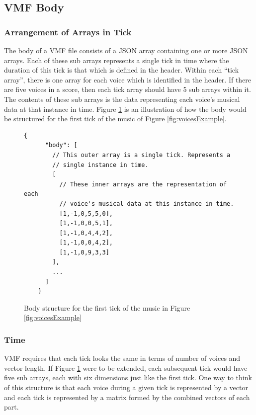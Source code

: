 \subsection{VMF Body}

\subsubsection{Arrangement of Arrays in Tick}

The body of a VMF file consists of a JSON array containing one or more JSON arrays. Each of these sub arrays represents a single tick in time where the duration of this tick is that which is defined in the header. Within each ``tick array'', there is one array for each voice which is identified in the header. If there are five voices in a score, then each tick array should have 5 sub arrays within it. The contents of these sub arrays is the data representing each voice's musical data at that instance in time. Figure \ref{fig:fiveVoiceTick} is an illustration of how the body would be structured for the first tick of the music of Figure \ref{fig:voicesExample}.

\begin{figure}
  \begin{center}
    \begin{Verbatim}[fontfamily=courier, xleftmargin=\parindent]
    {
      "body": [
        // This outer array is a single tick. Represents a
        // single instance in time.
        [
          // These inner arrays are the representation of each
          // voice's musical data at this instance in time.
          [1,-1,0,5,5,0],
          [1,-1,0,0,5,1],
          [1,-1,0,4,4,2],
          [1,-1,0,0,4,2],
          [1,-1,0,9,3,3]
        ],
        ...
      ]
    }
    \end{Verbatim}
    \caption{Body structure for the first tick of the music in Figure \ref{fig:voicesExample}}
    \label{fig:fiveVoiceTick}
  \end{center}
\end{figure}

\subsubsection{Time}

VMF requires that each tick looks the same in terms of number of voices and vector length. If Figure \ref{fig:fiveVoiceTick} were to be extended, each subsequent tick would have five sub arrays, each with six dimensions just like the first tick. One way to think of this structure is that each voice during a given tick is represented by a vector and each tick is represented by a matrix formed by the combined vectors of each part.

